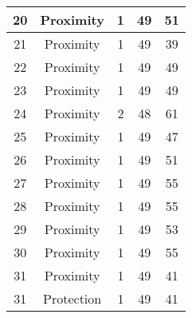 \documentclass[results.tex]{subfiles}
\begin{document}
\begin{center}
\begin{tabular}{| c || c | c | c | c |}
            \hline
            20                      & Proximity                    & 1                      & 49                      & 51                   \\
            \hline
            21                      & Proximity                    & 1                      & 49                      & 39                   \\
            \hline
            22                      & Proximity                    & 1                      & 49                      & 49                   \\
            \hline
            23                      & Proximity                    & 1                      & 49                      & 49                   \\
            \hline
            24                      & Proximity                    & 2                      & 48                      & 61                   \\
            \hline
            25                      & Proximity                    & 1                      & 49                      & 47                   \\
            \hline
            26                      & Proximity                    & 1                      & 49                      & 51                   \\
            \hline
            27                      & Proximity                    & 1                      & 49                      & 55                   \\
            \hline
            28                      & Proximity                    & 1                      & 49                      & 55                   \\
            \hline
            29                      & Proximity                    & 1                      & 49                      & 53                   \\
            \hline
            30                      & Proximity                    & 1                      & 49                      & 55                   \\
            \hline
            31                      & Proximity                    & 1                      & 49                      & 41                   \\
            \hline
            31                      & Protection                   & 1                      & 49                      & 41                   \\

\end{tabular}
\end{center}
\end{document}

